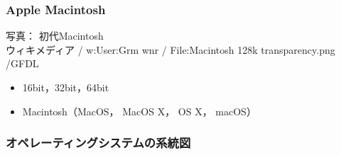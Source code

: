 \documentclass[dvipdfmx]{beamer}
\begin{document}
\begin{frame}
  \frametitle{Apple Macintosh}
      {\tiny
        \begin{center}
          写真： 初代Macintosh \\
          ウィキメディア / w:User:Grm wnr / 
          File:Macintosh 128k transparency.png /GFDL
        \end{center}
      }
  \begin{itemize}
    \item 16bit，32bit，64bit
    \item Macintosh（MacOS， MacOS X， OS X， macOS）
  \end{itemize}
\end{frame}

\begin{frame}
  \frametitle{オペレーティングシステムの系統図}
\end{frame}
\end{document}
